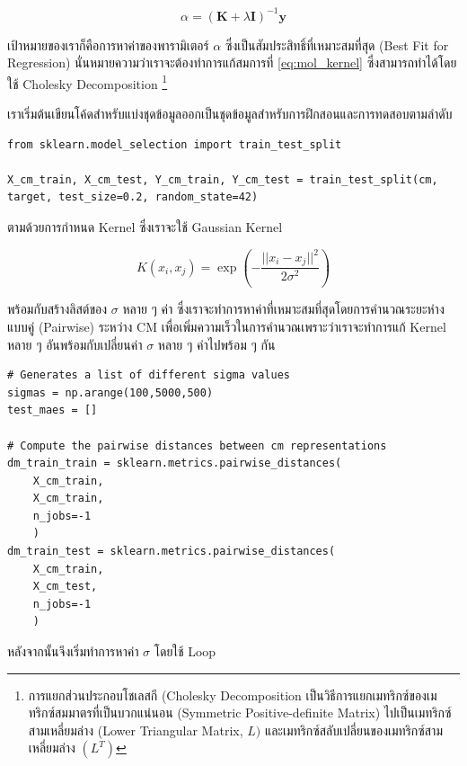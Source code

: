 \begin{equation}\label{eq:mol_kernel}
    \alpha = (\bm{K} + \lambda\bm{I} ) ^{-1} \bm{y}
\end{equation}

\noindent เป้าหมายของเราก็คือการหาค่าของพารามิเตอร์ $\alpha$ ซึ่งเป็นสัมประสิทธิ์ที่เหมาะสมที่สุด (Best Fit for Regression) 
นั่นหมายความว่าเราจะต้องทำการแก้สมการที่ \ref{eq:mol_kernel} ซึ่งสามารถทำได้โดยใช้ Cholesky Decomposition%
\footnote{การแยกส่วนประกอบโชเลสกี (Cholesky Decomposition เป็นวิธีการแยกเมทริกซ์ของเมทริกซ์สมมาตรที่เป็นบวกแน่นอน (Symmetric 
Positive-definite Matrix) ไปเป็นเมทริกซ์สามเหลี่ยมล่าง (Lower Triangular Matrix, $L)$ และเมทริกซ์สลับเปลี่ยนของเมทริกซ์สาม%
เหลี่ยมล่าง $(L^{T})$}

เราเริ่มต้นเขียนโค้ดสำหรับแบ่งชุดข้อมูลออกเป็นชุดข้อมูลสำหรับการฝึกสอนและการทดสอบตามลำดับ
\begin{lstlisting}[style=MyPython]
from sklearn.model_selection import train_test_split

X_cm_train, X_cm_test, Y_cm_train, Y_cm_test = train_test_split(cm, target, test_size=0.2, random_state=42)
\end{lstlisting}

\noindent ตามด้วยการกำหนด Kernel ซึ่งเราจะใช้ Gaussian Kernel 

\begin{equation}\label{eq:gaussian_kernel}
    K(x_{i}, x_{j}) = \exp \left( -\frac{||x_{i}-x_{j}||^2}{2\sigma^2} \right)
\end{equation}

\noindent พร้อมกับสร้างลิสต์ของ $\sigma$ หลาย ๆ ค่า ซึ่งเราจะทำการหาค่าที่เหมาะสมที่สุดโดยการคำนวณระยะห่างแบบคู่ (Pairwise) 
ระหว่าง CM เพื่อเพิ่มความเร็วในการคำนวณเพราะว่าเราจะทำการแก้ Kernel หลาย ๆ อันพร้อมกับเปลี่ยนค่า $\sigma$ หลาย ๆ ค่าไปพร้อม ๆ กัน

\begin{lstlisting}[style=MyPython]
# Generates a list of different sigma values
sigmas = np.arange(100,5000,500) 
test_maes = []

# Compute the pairwise distances between cm representations
dm_train_train = sklearn.metrics.pairwise_distances(
    X_cm_train, 
    X_cm_train, 
    n_jobs=-1
    )
dm_train_test = sklearn.metrics.pairwise_distances(
    X_cm_train, 
    X_cm_test, 
    n_jobs=-1
    )
\end{lstlisting}

\vspace{1em}
\noindent หลังจากนั้นจึงเริ่มทำการหาค่า $\sigma$ โดยใช้ Loop

